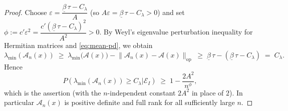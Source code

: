 \documentclass[10pt,a4paper]{amsart}
\begin{document}
\begin{proof}
Choose $\varepsilon=\dfrac{\underline{\beta}\,\tau-C_\lambda}{A}$ (so $A\varepsilon=\underline{\beta}\,\tau-C_\lambda>0$) and set $\phi:=c'\varepsilon^2=\dfrac{c'\left(\underline{\beta}\,\tau-C_\lambda\right)^2}{A^2}>0$.
By Weyl's eigenvalue perturbation inequality for Hermitian matrices and \eqref{eq:mean-pd}, we obtain 
\begin{equation}
    \lambda_{\min}(\mathscr{A}_n(x))\;\ge\;\lambda_{\min}\!\big(\mathscr{A}(x)\big)
-\big\|\mathscr{A}_n(x)-\mathscr{A}(x)\big\|_{\mathrm{op}}
\;\ge\;\underline{\beta}\,\tau-\left(\underline{\beta}\,\tau-C_\lambda\right)\;=\;C_\lambda .
\end{equation}
Hence
$$
P\!\left(\lambda_{\min}(\mathscr{A}_n(x))\ge C_\lambda \Big|\mathscr{E}_I\right)
\;\ge\;1-\frac{2A^2}{n^{\phi}} ,
$$
which is the assertion (with the $n$-independent constant $2A^2$ in place of $2$). In
particular $\mathscr{A}_n(x)$ is positive definite and full rank for all sufficiently large $n$.
\end{proof}
\end{document}
